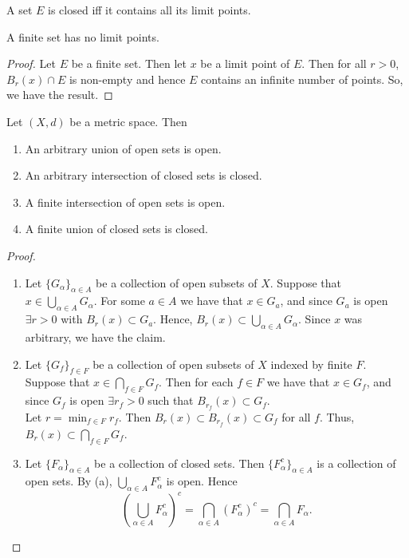 \documentclass{notes}
\begin{document}
\begin{theorem}
  A set $E$ is closed iff it contains all its limit points.
\end{theorem}

\begin{theorem}
  A finite set has no limit points.
\end{theorem}
\begin{proof}
  Let $E$ be a finite set. Then let $x$ be a limit point of $E$. Then for all $r > 0$, $B_r(x)\cap
  E$ is non-empty and hence $E$ contains an infinite number of points. So, we have the result.
\end{proof}

\begin{theorem}
  Let $(X,d)$ be a metric space. Then
  \begin{enumerate}
    \item An arbitrary union of open sets is open.
    \item An arbitrary intersection of closed sets is closed.
    \item A finite intersection of open sets is open.
    \item A finite union of closed sets is closed.  
  \end{enumerate}
\end{theorem}
\begin{proof}\leavevmode
  \begin{enumerate}
  \item Let $\{G_\alpha\}_{\alpha\in A}$ be a collection of open subsets of $X$. Suppose that $x\in\bigcup_{
  \alpha\in A}G_\alpha$. For some $a\in A$ we have that $x\in G_a$, and since $G_a$ is open $\exists r > 0$
  with $B_r(x)\subset G_a$. Hence, $B_r(x)\subset \bigcup_{\alpha\in A}G_\alpha$. Since $x$ was arbitrary,
  we have the claim.

  \item Let $\{G_f\}_{f\in F}$ be a collection of open subsets of $X$ indexed by finite $F$. Suppose that 
  $x\in\bigcap_{f\in F}G_f$. Then for each $f\in F$ we have that $x\in G_f$, and since $G_f$ is open
  $\exists r_f>0$ such that $B_{r_f}(x) \subset G_f$. \\

  Let $r = \min_{f\in F} r_f$. Then $B_r(x) \subset B_{r_f}(x) \subset G_f$ for all $f$. Thus, $B_r(x)
  \subset \bigcap_{f\in F}G_f$.

  \item Let $\{F_\alpha\}_{\alpha\in A}$ be a collection of closed sets. Then $\{F^c_\alpha\}_{\alpha
  \in A}$ is a collection of open sets. By (a), $\bigcup_{\alpha\in A}F^c_\alpha$ is open. Hence
  $$\left(\bigcup_{\alpha\in A}F^c_\alpha\right)^c = \bigcap_{\alpha\in A}\left(F_\alpha^c\right)^c
  = \bigcap_{\alpha\in A}F_\alpha. $$
  \end{enumerate} 
\end{proof}
\end{document}
